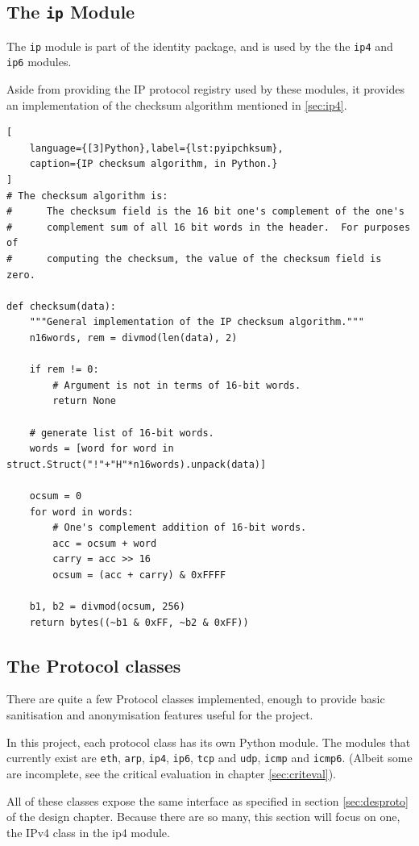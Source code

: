 \documentclass[10pt,a4paper,notitlepage,twoside]{report}
\begin{document}
\subsection{The \texttt{ip} Module}
The \texttt{ip} module is part of the identity package, and is used by the the \texttt{ip4} and \texttt{ip6} modules.

Aside from providing the IP protocol registry used by these modules, it provides an implementation of the checksum algorithm mentioned in \ref{sec:ip4}.
\begin{lstlisting}[
	language={[3]Python},label={lst:pyipchksum},
	caption={IP checksum algorithm, in Python.}
]
# The checksum algorithm is:
#      The checksum field is the 16 bit one's complement of the one's
#      complement sum of all 16 bit words in the header.  For purposes of
#      computing the checksum, the value of the checksum field is zero.

def checksum(data):
    """General implementation of the IP checksum algorithm."""
    n16words, rem = divmod(len(data), 2)

    if rem != 0:
        # Argument is not in terms of 16-bit words.
        return None

    # generate list of 16-bit words.
    words = [word for word in struct.Struct("!"+"H"*n16words).unpack(data)]

    ocsum = 0
    for word in words:
        # One's complement addition of 16-bit words.
        acc = ocsum + word
        carry = acc >> 16
        ocsum = (acc + carry) & 0xFFFF

    b1, b2 = divmod(ocsum, 256)
    return bytes((~b1 & 0xFF, ~b2 & 0xFF))
\end{lstlisting}

\subsection{The Protocol classes}
There are quite a few Protocol classes implemented, enough to provide basic sanitisation and anonymisation features useful for the project.

In this project, each protocol class has its own Python module. The modules that currently exist are \texttt{eth}, \texttt{arp}, \texttt{ip4}, \texttt{ip6}, \texttt{tcp} and \texttt{udp}, \texttt{icmp} and \texttt{icmp6}. (Albeit some are incomplete, see the critical evaluation in chapter \ref{sec:criteval}).

All of these classes expose the same interface as specified in section \ref{sec:desproto} of the design chapter. Because there are so many, this section will focus on one, the IPv4 class in the ip4 module.
\end{document}
